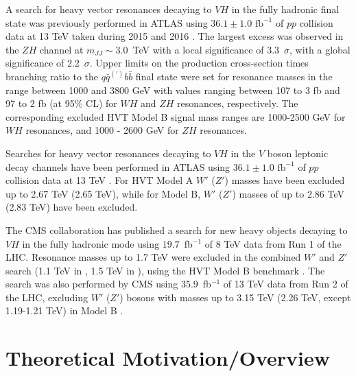 A search for heavy vector resonances decaying to $VH$ in the fully hadronic final state was previously performed in ATLAS using $36.1\pm1.0\text{~fb}^{-1}$ of $pp$ collision data at 13 TeV taken during 2015 and 2016 \cite{Aaboud:2017ahz}.
The largest excess was observed in the $ZH$ channel at $m_{JJ}\sim3.0$~TeV with a local significance of 3.3~$\sigma$, with a  global significance of  2.2~$\sigma$.
Upper limits on the production cross-section times branching ratio to the $q\bar{q}^{(\prime)}b\bar{b}$ final state were set for resonance masses in the range between 1000 and 3800 GeV with values ranging between 107 to 3 fb and 97 to 2 fb (at 95\% CL) for $WH$ and $ZH$ resonances, respectively.
The corresponding excluded HVT Model B signal mass ranges are 1000-2500 GeV for $WH$ resonances, and 1000 - 2600 GeV for $ZH$ resonances.

Searches for heavy vector resonances decaying to $VH$ in the $V$ boson leptonic decay channels have been performed in ATLAS using $36.1\pm1.0\text{~fb}^{-1}$ of $pp$ collision data at 13 TeV \cite{EXOT-2016-10}.
For HVT Model A $W'$ ($Z'$) masses have been excluded up to 2.67 TeV (2.65 TeV), while for Model B, $W'$ ($Z'$) masses of up to 2.86 TeV (2.83 TeV) have been excluded.

The CMS collaboration has published a search for new heavy objects decaying to $VH$ in the fully hadronic mode using $19.7$~fb$^{-1}$ of 8 TeV data from Run 1 of the LHC.
Resonance masses up to 1.7 TeV were excluded in the combined $W'$ and $Z'$ search (1.1 TeV in \zpzh, 1.5 TeV in \wpwh), using the HVT Model B benchmark \cite{Khachatryan:2015bma}.
The search was also performed by CMS using $35.9$~fb$^{-1}$ of 13 TeV data from Run 2 of the LHC, excluding $W'$ ($Z'$) bosons with masses up to 3.15 TeV (2.26 TeV, except 1.19-1.21 TeV) in Model B \cite{Sirunyan:2017wto}.


\section{Theoretical Motivation/Overview}

